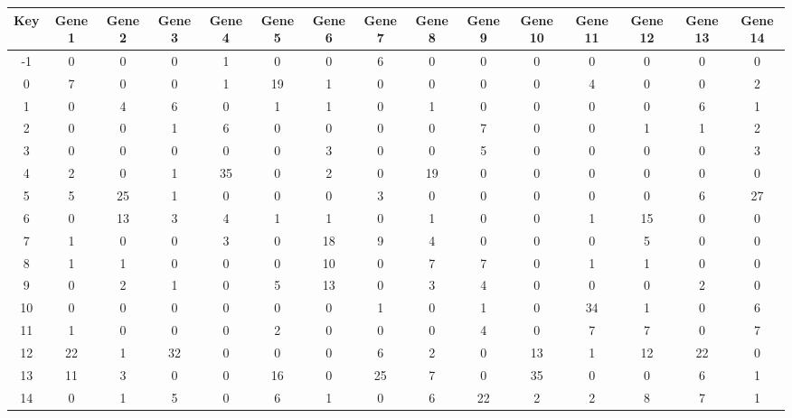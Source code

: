 \begin{tabular}{|c|c|c|c|c|c|c|c|c|c|c|c|c|c|c|}
\hline
Key & Gene 1 & Gene 2 & Gene 3 & Gene 4 & Gene 5 & Gene 6 & Gene 7 & Gene 8 & Gene 9 & Gene 10 & Gene 11 & Gene 12 & Gene 13 & Gene 14 \\
\hline
-1 & 0 & 0 & 0 & 1 & 0 & 0 & 6 & 0 & 0 & 0 & 0 & 0 & 0 & 0 \\
0 & 7 & 0 & 0 & 1 & 19 & 1 & 0 & 0 & 0 & 0 & 4 & 0 & 0 & 2 \\
1 & 0 & 4 & 6 & 0 & 1 & 1 & 0 & 1 & 0 & 0 & 0 & 0 & 6 & 1 \\
2 & 0 & 0 & 1 & 6 & 0 & 0 & 0 & 0 & 7 & 0 & 0 & 1 & 1 & 2 \\
3 & 0 & 0 & 0 & 0 & 0 & 3 & 0 & 0 & 5 & 0 & 0 & 0 & 0 & 3 \\
4 & 2 & 0 & 1 & 35 & 0 & 2 & 0 & 19 & 0 & 0 & 0 & 0 & 0 & 0 \\
5 & 5 & 25 & 1 & 0 & 0 & 0 & 3 & 0 & 0 & 0 & 0 & 0 & 6 & 27 \\
6 & 0 & 13 & 3 & 4 & 1 & 1 & 0 & 1 & 0 & 0 & 1 & 15 & 0 & 0 \\
7 & 1 & 0 & 0 & 3 & 0 & 18 & 9 & 4 & 0 & 0 & 0 & 5 & 0 & 0 \\
8 & 1 & 1 & 0 & 0 & 0 & 10 & 0 & 7 & 7 & 0 & 1 & 1 & 0 & 0 \\
9 & 0 & 2 & 1 & 0 & 5 & 13 & 0 & 3 & 4 & 0 & 0 & 0 & 2 & 0 \\
10 & 0 & 0 & 0 & 0 & 0 & 0 & 1 & 0 & 1 & 0 & 34 & 1 & 0 & 6 \\
11 & 1 & 0 & 0 & 0 & 2 & 0 & 0 & 0 & 4 & 0 & 7 & 7 & 0 & 7 \\
12 & 22 & 1 & 32 & 0 & 0 & 0 & 6 & 2 & 0 & 13 & 1 & 12 & 22 & 0 \\
13 & 11 & 3 & 0 & 0 & 16 & 0 & 25 & 7 & 0 & 35 & 0 & 0 & 6 & 1 \\
14 & 0 & 1 & 5 & 0 & 6 & 1 & 0 & 6 & 22 & 2 & 2 & 8 & 7 & 1 \\
\hline
\end{tabular}